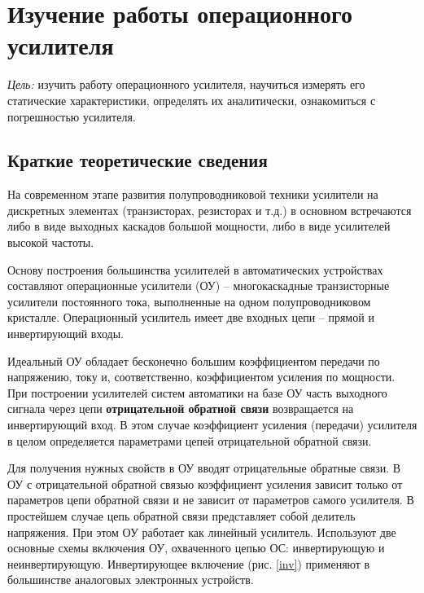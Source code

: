 \section{Изучение работы операционного усилителя}

{\it Цель:} изучить работу операционного усилителя, научиться измерять его статические характеристики, определять их аналитически, ознакомиться с погрешностью усилителя.
 
\subsection{Краткие теоретические сведения}

На современном этапе развития полупроводниковой техники усилители на дискретных элементах (транзисторах, резисторах и т.д.) в основном встречаются либо в виде выходных каскадов большой мощности, либо в виде усилителей высокой частоты.

Основу построения большинства усилителей в автоматических устройствах составляют операционные усилители (ОУ) -- многокаскадные транзисторные усилители постоянного тока, выполненные на одном полупроводниковом кристалле. 
Операционный усилитель имеет две входных цепи -- прямой и инвертирующий входы.

Идеальный ОУ обладает бесконечно большим коэффициентом передачи по напряжению, току и, соответственно, коэффициентом усиления по мощности. При построении усилителей систем автоматики на базе ОУ часть выходного сигнала через цепи {\bf отрицательной обратной связи} 
возвращается на инвертирующий вход. 
В этом случае коэффициент усиления (передачи) усилителя в целом определяется параметрами цепей отрицательной обратной связи.

Для получения нужных свойств в ОУ вводят отрицательные обратные связи. В ОУ с отрицательной обратной связью коэффициент усиления
зависит только от параметров цепи обратной связи и не зависит от параметров самого усилителя. В простейшем случае цепь 
обратной связи представляет собой делитель напряжения. При этом ОУ работает как линейный усилитель. Используют две основные
схемы включения ОУ, охваченного цепью ОС: инвертирующую и неинвертирующую. Инвертирующее включение (рис. \ref{inv}) применяют в 
большинстве аналоговых электронных устройств.

